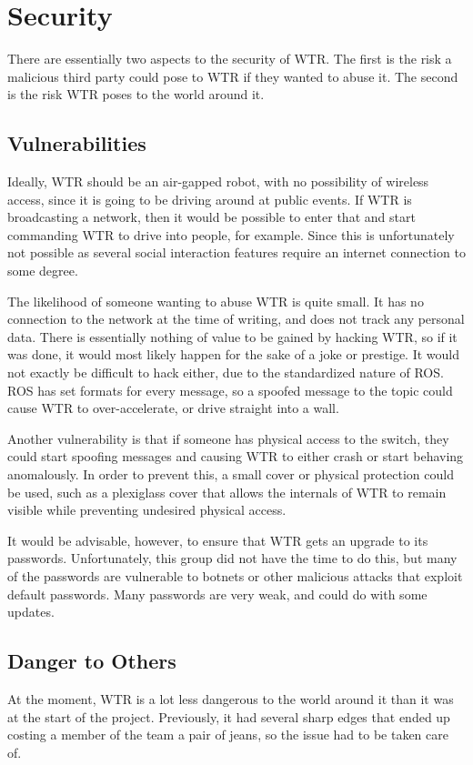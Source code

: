 \section{Security}
\label{sec::security}
There are essentially two aspects to the security of WTR.
The first is the risk a malicious third party could pose to WTR if they wanted to abuse it.
The second is the risk WTR poses to the world around it.

\subsection{Vulnerabilities}
Ideally, WTR should be an air-gapped robot, with no possibility of wireless access, since it is going to be driving around at public events.
If WTR is broadcasting a network, then it would be possible to enter that and start commanding WTR to drive into people, for example.
Since this is unfortunately not possible as several social interaction features require an internet connection to some degree.

The likelihood of someone wanting to abuse WTR is quite small.
It has no connection to the network at the time of writing, and does not track any personal data.
There is essentially nothing of value to be gained by hacking WTR, so if it was done, it would most likely happen for the sake of a joke or prestige.
It would not exactly be difficult to hack either, due to the standardized nature of ROS.
ROS has set formats for every message, so a spoofed message to the  topic could cause WTR to over-accelerate, or drive straight into a wall.

Another vulnerability is that if someone has physical access to the switch, they could start spoofing messages and causing WTR to either crash or start behaving anomalously.
In order to prevent this, a small cover or physical protection could be used, such as a plexiglass cover that allows the internals of WTR to remain visible while preventing undesired physical access.

It would be advisable, however, to ensure that WTR gets an upgrade to its passwords.
Unfortunately, this group did not have the time to do this, but many of the passwords are vulnerable to botnets or other malicious attacks that exploit default passwords.
Many passwords are very weak, and could do with some updates.

\subsection{Danger to Others}
At the moment, WTR is a lot less dangerous to the world around it than it was at the start of the project.
Previously, it had several sharp edges that ended up costing a member of the team a pair of jeans, so the issue had to be taken care of.

